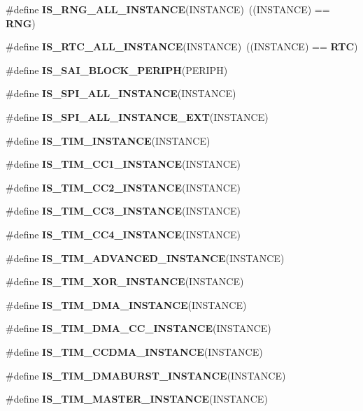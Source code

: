 \begin{DoxyCompactItemize}
\#define \textbf{ I\+S\+\_\+\+R\+N\+G\+\_\+\+A\+L\+L\+\_\+\+I\+N\+S\+T\+A\+N\+CE}(I\+N\+S\+T\+A\+N\+CE)~((I\+N\+S\+T\+A\+N\+CE) == \textbf{ R\+NG})
\item 
\#define \textbf{ I\+S\+\_\+\+R\+T\+C\+\_\+\+A\+L\+L\+\_\+\+I\+N\+S\+T\+A\+N\+CE}(I\+N\+S\+T\+A\+N\+CE)~((I\+N\+S\+T\+A\+N\+CE) == \textbf{ R\+TC})
\item 
\#define \textbf{ I\+S\+\_\+\+S\+A\+I\+\_\+\+B\+L\+O\+C\+K\+\_\+\+P\+E\+R\+I\+PH}(P\+E\+R\+I\+PH)
\item 
\#define \textbf{ I\+S\+\_\+\+S\+P\+I\+\_\+\+A\+L\+L\+\_\+\+I\+N\+S\+T\+A\+N\+CE}(I\+N\+S\+T\+A\+N\+CE)
\item 
\#define \textbf{ I\+S\+\_\+\+S\+P\+I\+\_\+\+A\+L\+L\+\_\+\+I\+N\+S\+T\+A\+N\+C\+E\+\_\+\+E\+XT}(I\+N\+S\+T\+A\+N\+CE)
\item 
\#define \textbf{ I\+S\+\_\+\+T\+I\+M\+\_\+\+I\+N\+S\+T\+A\+N\+CE}(I\+N\+S\+T\+A\+N\+CE)
\item 
\#define \textbf{ I\+S\+\_\+\+T\+I\+M\+\_\+\+C\+C1\+\_\+\+I\+N\+S\+T\+A\+N\+CE}(I\+N\+S\+T\+A\+N\+CE)
\item 
\#define \textbf{ I\+S\+\_\+\+T\+I\+M\+\_\+\+C\+C2\+\_\+\+I\+N\+S\+T\+A\+N\+CE}(I\+N\+S\+T\+A\+N\+CE)
\item 
\#define \textbf{ I\+S\+\_\+\+T\+I\+M\+\_\+\+C\+C3\+\_\+\+I\+N\+S\+T\+A\+N\+CE}(I\+N\+S\+T\+A\+N\+CE)
\item 
\#define \textbf{ I\+S\+\_\+\+T\+I\+M\+\_\+\+C\+C4\+\_\+\+I\+N\+S\+T\+A\+N\+CE}(I\+N\+S\+T\+A\+N\+CE)
\item 
\#define \textbf{ I\+S\+\_\+\+T\+I\+M\+\_\+\+A\+D\+V\+A\+N\+C\+E\+D\+\_\+\+I\+N\+S\+T\+A\+N\+CE}(I\+N\+S\+T\+A\+N\+CE)
\item 
\#define \textbf{ I\+S\+\_\+\+T\+I\+M\+\_\+\+X\+O\+R\+\_\+\+I\+N\+S\+T\+A\+N\+CE}(I\+N\+S\+T\+A\+N\+CE)
\item 
\#define \textbf{ I\+S\+\_\+\+T\+I\+M\+\_\+\+D\+M\+A\+\_\+\+I\+N\+S\+T\+A\+N\+CE}(I\+N\+S\+T\+A\+N\+CE)
\item 
\#define \textbf{ I\+S\+\_\+\+T\+I\+M\+\_\+\+D\+M\+A\+\_\+\+C\+C\+\_\+\+I\+N\+S\+T\+A\+N\+CE}(I\+N\+S\+T\+A\+N\+CE)
\item 
\#define \textbf{ I\+S\+\_\+\+T\+I\+M\+\_\+\+C\+C\+D\+M\+A\+\_\+\+I\+N\+S\+T\+A\+N\+CE}(I\+N\+S\+T\+A\+N\+CE)
\item 
\#define \textbf{ I\+S\+\_\+\+T\+I\+M\+\_\+\+D\+M\+A\+B\+U\+R\+S\+T\+\_\+\+I\+N\+S\+T\+A\+N\+CE}(I\+N\+S\+T\+A\+N\+CE)
\item 
\#define \textbf{ I\+S\+\_\+\+T\+I\+M\+\_\+\+M\+A\+S\+T\+E\+R\+\_\+\+I\+N\+S\+T\+A\+N\+CE}(I\+N\+S\+T\+A\+N\+CE)

\end{DoxyCompactItemize}
